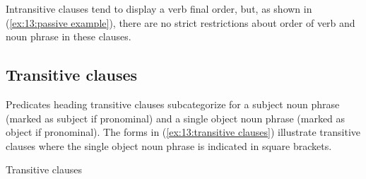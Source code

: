 \z


Intransitive clauses tend to display a verb final order, but, as shown in (\ref{ex:13:passive example}), there are no strict restrictions about order of verb and noun phrase in these clauses.

\subsection{Transitive clauses}
\label{subsec: transitive clauses}

Predicates heading transitive clauses subcategorize for a subject noun phrase (marked as subject if pronominal) and a single object noun phrase (marked as object if pronominal). The forms in (\ref{ex:13:transitive clauses}) illustrate transitive clauses where the single object noun phrase is indicated in square brackets.

\ea\label{ex:13:transitive clauses}
{Transitive clauses}

